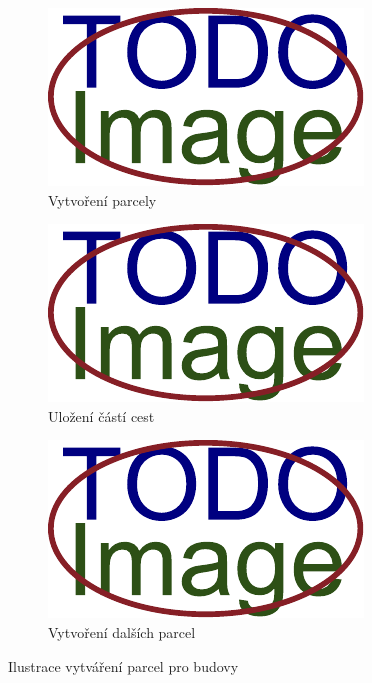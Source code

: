 \begin{figure}[H]
	\centering
	\begin{subfigure}{0.32\textwidth}
		\includegraphics[width=\textwidth]{obrazky-figures/placeholder.pdf}
		\caption{Vytvoření parcely}
		\label{fig:parcely:budovy:vytváření:první}
	\end{subfigure}
	\hfill
	\begin{subfigure}{0.32\textwidth}
		\includegraphics[width=\textwidth]{obrazky-figures/placeholder.pdf}
		\caption{Uložení částí cest}
		\label{fig:parcely:budovy:vytváření:uložení}
	\end{subfigure}
	\hfill
	\begin{subfigure}{0.32\textwidth}
		\includegraphics[width=\textwidth]{obrazky-figures/placeholder.pdf}
		\caption{Vytvoření dalších parcel}
		\label{fig:parcely:budovy:vytváření:další}
	\end{subfigure}
	\caption{Ilustrace vytváření parcel pro budovy}
	\label{fig:parcely:budovy:vytváření}
\end{figure}

